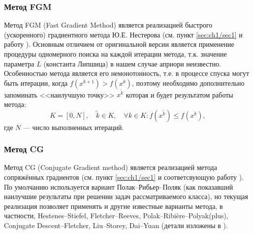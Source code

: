 \subsubsection{Метод FGM}
\label{FGM_DESC}

  Метод FGM (Fast Gradient Method) является реализацией быстрого (ускоренного) градиентного метода Ю.Е. Нестерова (см. пункт \ref{sec:ch1/sec1} и работу \cite{su2014differential}). Основным отличием от оригинальной версии является применение процедуры одномерного поиска на каждой итерации метода, т.к. значение параметра $L$ (константа Липшица) в нашем случае априори неизвестно. Особенностью метода является его немонотонность, т.е. в процессе спуска могут быть итерации, когда  $f(x^{k+1}) > f(x^k)$, поэтому необходимо дополнительно запоминать <<наилучшую точку>> $x^{\tilde{k}}$ которая и будет результатом работы метода:
  \[
    K = [0, N],\quad \tilde{k} \in K,\quad \forall k \in K: f(x^{\tilde{k}}) \le f(x^k) ,
  \]
  где $N$ --- число выполненных итераций.

  \iffalse
  Описание реализованного метода FGM представлено в алгоритме~\ref{FGM_ALGORITHM}.

  \begin{algorithm}[h]
    \caption{Метод FGM}
    \label{FGM_ALGORITHM}
    \KwData{$x^0 \in \mathbb{R}^n$}
    \KwResult{$x_*$}
    $x_* \leftarrow x^0$\;
    $x^{-1} \leftarrow x^0$\;
    $\theta^{-1} \leftarrow 1$\;
    $k \leftarrow 0$\;
    \Repeat {\textbf{convergence}} {
      $\theta_k \leftarrow 0.5\ \theta_{k-1} \left( \sqrt{ \theta_{k-1}^2 + 4} - \theta_{k-1} \right)$\;
      $\beta_k \leftarrow \theta_{k-1} (1 - \theta_{k-1}) / (\theta_{k-1}^2 + \theta_k)$\;
      $w^k \leftarrow x^k + \beta_k (x^{k} - x^{k-1})$\;
      $r^k \leftarrow -\nabla f(w^k) / \| \nabla f(w^k) \|_2$\;
      $h_k \leftarrow \argmin_{h \ge 0} f( w^k + h r^k )$\;
      $x^{k+1} \leftarrow w^k + h_k r^k$\;
      \If{$f(x^{k+1}) < f(x_*)$} {
        $x_* \leftarrow x^{k+1}$\;
      }
      Удаляем вектор $x^{k-1}$ из памяти\;
      $k = k + 1$\;
    }
  \end{algorithm}
  \fi

\subsubsection{Метод CG} \label{CG_DESC}

  Метод CG (Conjugate Gradient method) является реализацией метода сопряжённых градиентов (см. пункт \ref{sec:ch1/sec1} и соответсвующую работу \cite{nocedal2006sequential}). По умолчанию используется вариант Полак--Рибьер--Поляк (как показавший наилучшие результаты при решении задач рассматриваемого класса), но текущая реализация позволяет применять и другие известные варианты метода, в частности, Hestenes--Stiefel, Fletcher--Reeves, Polak--Ribière--Polyak(plus), Con\-ju\-gate Descent--Flet\-cher, Liu--Storey, Dai--Yuan (детали изложены в \cite{andrei_40_CG_2008}).

